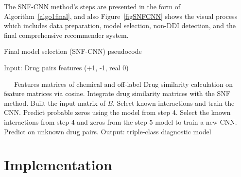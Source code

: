 \documentclass[unnumsec,webpdf,contemporary,large]{oup-authoring-template}%
\theoremstyle{thmstyleone}%
\theoremstyle{thmstyletwo}%
\theoremstyle{thmstylethree}%
\begin{document}
The SNF-CNN method’s steps are presented in the form of Algorithm~\ref{algo1final}, and also Figure~\ref{figSNFCNN} shows the visual process which includes data preparation, model selection, non-DDI detection, and the final comprehensive recommender system.
\begin{algorithm}[!t]
\caption{Final model selection (SNF-CNN) pseudocode}\label{algo1final}
\begin{algorithmic}[1]
\Require Input: Drug pairs features (+1, -1, real 0)

~~~Features matrices of chemical and off-label 
\State Drug similarity calculation on feature matrices via cosine.
\State Integrate drug similarity matrices with the SNF method.
\State Built the input matrix of $B$.
\State Select known interactions and train the CNN.
\State Predict probable zeros using the model from step 4.
\State Select the known interactions from step 4 and zeros from the step 5 model to train a new CNN.
\State Predict on unknown drug pairs.
\Ensure Output: triple-class diagnostic model 
\end{algorithmic}
\end{algorithm}
\section{Implementation}\label{sec4}
\end{document}
